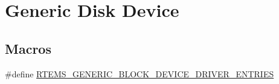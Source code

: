 \hypertarget{group__rtems__blkdev__generic}{}\section{Generic Disk Device}
\label{group__rtems__blkdev__generic}
\subsection*{Macros}
\begin{DoxyCompactItemize}
\item 
\#define \mbox{\hyperlink{group__rtems__blkdev__generic_gab2d9149dc532657053697e5010fffa82}{R\+T\+E\+M\+S\+\_\+\+G\+E\+N\+E\+R\+I\+C\+\_\+\+B\+L\+O\+C\+K\+\_\+\+D\+E\+V\+I\+C\+E\+\_\+\+D\+R\+I\+V\+E\+R\+\_\+\+E\+N\+T\+R\+I\+ES}}
\end{DoxyCompactItemize}
